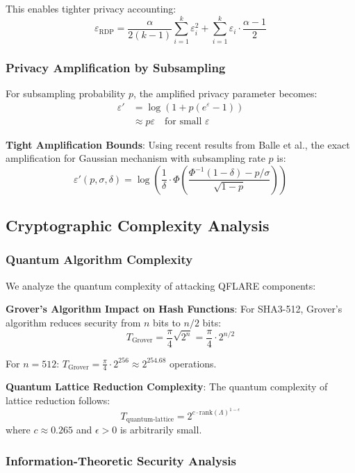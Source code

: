 \documentclass[journal,onecolumn]{IEEEtran}
\begin{document}
This enables tighter privacy accounting:
$$\varepsilon_{\text{RDP}} = \frac{\alpha}{2(k-1)} \sum_{i=1}^k \varepsilon_i^2 + \sum_{i=1}^k \varepsilon_i \cdot \frac{\alpha-1}{2}$$

\subsubsection{Privacy Amplification by Subsampling}

For subsampling probability $p$, the amplified privacy parameter becomes:
\begin{align}
\varepsilon' &= \log\left(1 + p(e^\varepsilon - 1)\right) \\
&\approx p\varepsilon \quad \text{for small } \varepsilon
\end{align}

\textbf{Tight Amplification Bounds}: Using recent results from Balle et al., the exact amplification for Gaussian mechanism with subsampling rate $p$ is:
$$\varepsilon'(p, \sigma, \delta) = \log\left(\frac{1}{\delta} \cdot \Phi\left(\frac{\Phi^{-1}(1-\delta) - p/\sigma}{\sqrt{1-p}}\right)\right)$$

\subsection{Cryptographic Complexity Analysis}

\subsubsection{Quantum Algorithm Complexity}

We analyze the quantum complexity of attacking QFLARE components:

\textbf{Grover's Algorithm Impact on Hash Functions}:
For SHA3-512, Grover's algorithm reduces security from $n$ bits to $n/2$ bits:
$$T_{\text{Grover}} = \frac{\pi}{4}\sqrt{2^n} = \frac{\pi}{4} \cdot 2^{n/2}$$

For $n = 512$: $T_{\text{Grover}} = \frac{\pi}{4} \cdot 2^{256} \approx 2^{254.68}$ operations.

\textbf{Quantum Lattice Reduction Complexity}:
The quantum complexity of lattice reduction follows:
$$T_{\text{quantum-lattice}} = 2^{c \cdot \text{rank}(\Lambda)^{1-\epsilon}}$$
where $c \approx 0.265$ and $\epsilon > 0$ is arbitrarily small.

\subsubsection{Information-Theoretic Security Analysis}
\end{document}
